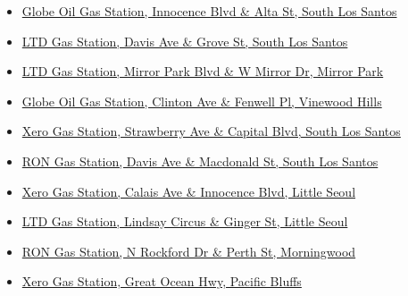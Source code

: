 \documentclass[
  openany]{book}
\providecommand{\tightlist}{%
  \setlength{\itemsep}{0pt}\setlength{\parskip}{0pt}}
\begin{document}
\begin{itemize}
\tightlist
\item
  \href{https://grandtheftdata.com/landmarks/\#513.325,-1374.453,4,atlas,name=gas_station,Globe_Oil_Gas_Station,_Innocence_Blvd_\&_Alta_St,_South_Los_Santos}{Globe Oil Gas Station, Innocence Blvd \& Alta St, South Los Santos}
\item
  \href{https://grandtheftdata.com/landmarks/\#513.325,-1374.453,4,atlas,name=gas_station,LTD_Gas_Station,_Davis_Ave_\&_Grove_St,_South_Los_Santos}{LTD Gas Station, Davis Ave \& Grove St, South Los Santos}
\item
  \href{https://grandtheftdata.com/landmarks/\#378.149,-934.191,4,atlas,name=gas_station,LTD_Gas_Station,_Mirror_Park_Blvd_\&_W_Mirror_Dr,_Mirror_Park}{LTD Gas Station, Mirror Park Blvd \& W Mirror Dr, Mirror Park}
\item
  \href{https://grandtheftdata.com/landmarks/\#613.567,192.271,6,atlas,name=gas_station,Globe_Oil_Gas_Station,_Clinton_Ave_\&_Fenwell_Pl,_Vinewood_Hills}{Globe Oil Gas Station, Clinton Ave \& Fenwell Pl, Vinewood Hills}
\item
  \href{https://grandtheftdata.com/landmarks/\#513.325,-1374.453,4,atlas,name=gas_station,Xero_Gas_Station,_Strawberry_Ave_\&_Capital_Blvd,_South_Los_Santos}{Xero Gas Station, Strawberry Ave \& Capital Blvd, South Los Santos}
\item
  \href{https://grandtheftdata.com/landmarks/\#513.325,-1374.453,4,atlas,name=gas_station,RON_Gas_Station,_Davis_Ave_\&_Macdonald_St,_South_Los_Santos}{RON Gas Station, Davis Ave \& Macdonald St, South Los Santos}
\item
  \href{https://grandtheftdata.com/landmarks/\#513.325,-1374.453,4,atlas,name=gas_station,Xero_Gas_Station,_Calais_Ave_\&_Innocence_Blvd,_Little_Seoul}{Xero Gas Station, Calais Ave \& Innocence Blvd, Little Seoul}
\item
  \href{https://grandtheftdata.com/landmarks/\#513.325,-1374.453,4,atlas,name=gas_station,LTD_Gas_Station,_Lindsay_Circus_\&_Ginger_St,_Little_Seoul}{LTD Gas Station, Lindsay Circus \& Ginger St, Little Seoul}
\item
  \href{https://grandtheftdata.com/landmarks/\#-1543.17,-676.107,4,atlas,name=gas_station,RON_Gas_Station,_N_Rockford_Dr_\&_Perth_St,_Morningwood}{RON Gas Station, N Rockford Dr \& Perth St, Morningwood}
\item
  \href{https://grandtheftdata.com/landmarks/\#-1543.17,-676.107,4,atlas,name=gas_station,Xero_Gas_Station,_Great_Ocean_Hwy,_Pacific_Bluffs}{Xero Gas Station, Great Ocean Hwy, Pacific Bluffs}
\end{itemize}
\end{document}
